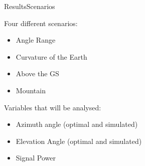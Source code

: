 \begin{frame}{Results}{Scenarios}

  \begin{block}{Four different scenarios:}
    \begin{itemize}
	  \item Angle Range 
	  \item Curvature of the Earth 
	  \item Above the GS
	  \item Mountain
    \end{itemize}
  \end{block}
  
  \begin{block}{Variables that will be analysed:}
    \begin{itemize}
	  \item Azimuth angle (optimal and simulated) 
	  \item Elevation Angle (optimal and simulated) 
	  \item Signal Power 
    \end{itemize}      
  \end{block}
  
\end{frame}